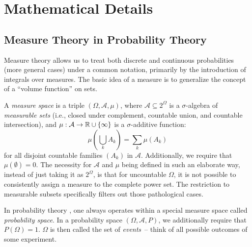\chapter{Mathematical Details}

\section{Measure Theory in Probability Theory}
\label{sec:measure-theory}

Measure theory \parencites{tao2011introduction}[section 10.5]{bronstein1995taschenbuch} allows us to
treat both discrete and continuous probabilities (more general cases) under a common notation,
primarily by the introduction of integrals over measures.  The basic idea of a measure is to
generalize the concept of a \enquote{volume function} on sets.

A \emph{measure space} is a triple \((\Omega, \mathcal{A}, \mu)\), where
\(\mathcal{A} \subseteq 2^{\Omega}\) is a \(\sigma\)-algebra of \emph{measurable sets} (i.e., closed
under complement, countable union, and countable intersection), and
\(\mu: \mathcal{A} \to \mathbb{R} \cup \{\infty\}\) is a \(\sigma\)-additive function:
\begin{equation}
  \label{eq:sigma-additivity}
  \mu\left( \bigcup_{k} A_k \right) = \sum_{k} \mu(A_k)
\end{equation}
for all disjoint countable families \((A_k)\) in \(\mathcal{A}\).  Additionally, we require that
\(\mu(\emptyset) = 0\).  The necessity for \(\mathcal{A}\) and \(\mu\) being defined in such an
elaborate way, instead of just taking it as \(2^{\Omega}\), is that for uncountable \(\Omega\), it
is not possible to consistently assign a measure to the complete power set.  The restriction to
measurable subsets specifically filters out those pathological cases.

In probability theory \parencite{kallenberg2006foundations}, one always operates within a special
measure space called \emph{probability space}.  In a probability space \((\Omega, \mathcal{A}, P)\),
we additionally require that \(P(\Omega) = 1\).  \(\Omega\) is then called the set of
\emph{events}~-- think of all possible outcomes of some experiment. 


